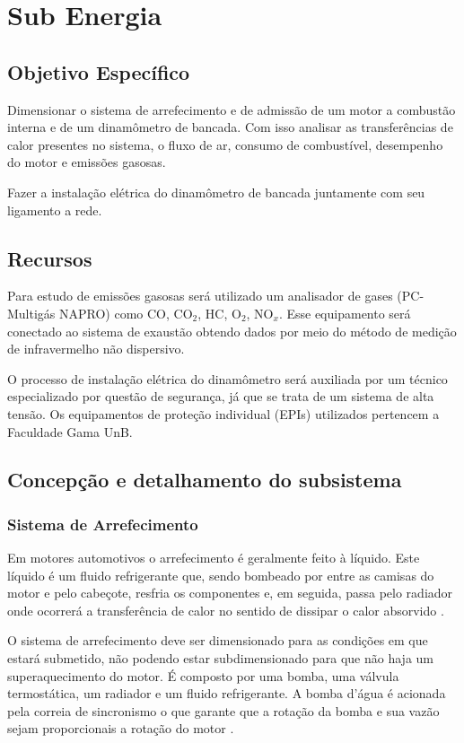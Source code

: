 
\chapter[Sub Energia]{Sub Energia}

\section{Objetivo Específico}

Dimensionar o sistema de arrefecimento e de admissão de um motor a combustão interna e de um dinamômetro de bancada. Com isso analisar as transferências de calor presentes no sistema, o fluxo de ar, consumo de combustível, desempenho do motor e emissões gasosas.

Fazer a instalação elétrica do dinamômetro de bancada juntamente com seu ligamento a rede.

\section{Recursos}

Para estudo de emissões gasosas será utilizado um analisador de gases (PC-Multigás NAPRO) como CO, CO$_{2}$, HC, O$_{2}$, NO$_{x}$. Esse equipamento será conectado ao sistema de exaustão obtendo dados por meio do método de medição de infravermelho não dispersivo. 

O processo de instalação elétrica do dinamômetro será auxiliada por um técnico especializado por questão de segurança, já que se trata de um sistema de alta tensão. Os equipamentos de proteção individual (EPIs) utilizados pertencem a Faculdade Gama UnB.

\section{Concepção e detalhamento do subsistema}

\subsection{Sistema de Arrefecimento}

Em motores automotivos o arrefecimento é geralmente feito à líquido. Este líquido é um fluido refrigerante que, sendo bombeado por entre as camisas do motor e pelo cabeçote, resfria os componentes e, em seguida, passa pelo radiador onde ocorrerá a transferência de calor no sentido de dissipar o calor absorvido \cite{energiaToyota}.

O sistema de arrefecimento deve ser dimensionado para as condições em que estará submetido, não podendo estar subdimensionado para que não haja um superaquecimento do motor. É composto por uma bomba, uma válvula termostática, um radiador e um fluido refrigerante. A bomba d'água é acionada pela correia de sincronismo o que garante que a rotação da bomba e sua vazão sejam proporcionais a rotação do motor \cite{energiaToyota}. 

